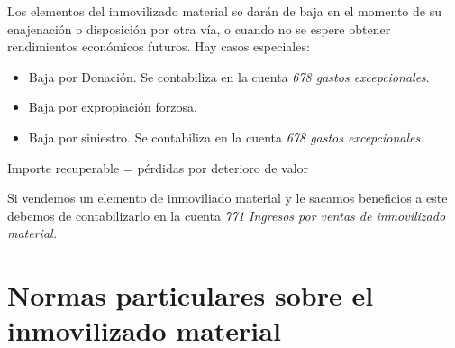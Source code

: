 \documentclass[a4paper,12pt]{article}
\begin{document}
Los elementos del inmovilizado material se darán de baja en el momento de su enajenación o disposición por otra vía, o cuando no se espere obtener rendimientos económicos futuros.
Hay casos especiales:
\begin{itemize}
    \item Baja por Donación. Se contabiliza en la cuenta \textit{678 gastos excepcionales}.
    \item Baja por expropiación forzosa.
    \item Baja por siniestro. Se contabiliza en la cuenta \textit{678 gastos excepcionales}.
\end{itemize}

\begin{tcolorbox}[colback=yellow!20!white, colframe=yellow!80!black, title=Aclaración]
Importe recuperable = pérdidas por deterioro de valor
\end{tcolorbox}

\begin{tcolorbox}[colback=yellow!20!white, colframe=yellow!80!black, title=Nota]
    Si vendemos un elemento de inmoviliado material y le sacamos beneficios a este debemos de contabilizarlo en la cuenta \textit{771 Ingresos por ventas de inmovilizado material.}
\end{tcolorbox}

\section{Normas particulares sobre el inmovilizado material}
\end{document}
